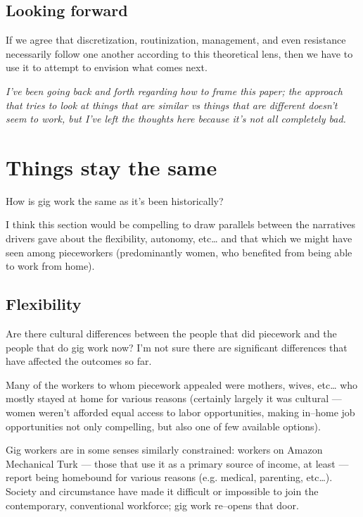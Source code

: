 \documentclass{sigchi}
\begin{document}



\subsection{Looking forward}
If we agree that
discretization,
routinization,
management,
and even resistance
necessarily follow one another according to this theoretical lens,
then we have to use it to attempt to envision
what comes next.



\textit{I've been going back and forth regarding how to frame this paper;
the approach that tries to look at
things that are similar vs things that are different
doesn't seem to work, but
I've left the thoughts here because it's not all completely bad.}

\section{Things stay the same}
How is gig work the same as it's been historically?

I think this section would be compelling to draw parallels between
the narratives drivers gave about the flexibility, autonomy, etc\dots
and that which we might have seen among pieceworkers
(predominantly women, who benefited from being able to work from home).

\subsection{Flexibility}
Are there cultural differences between the people that did piecework and
the people that do gig work now?
I'm not sure there are significant differences that have affected the outcomes so far.

Many of the workers to whom piecework appealed were mothers, wives, etc\dots
who mostly stayed at home for various reasons
(certainly largely it was cultural
--- women weren't afforded equal access to labor opportunities,
making in--home job opportunities not only compelling, but also one of few available options).

Gig workers are in some senses similarly constrained:
workers on Amazon Mechanical Turk
--- those that use it as a primary source of income, at least ---
report being homebound for various reasons (e.g. medical, parenting, etc\dots).
Society and circumstance have made it difficult
or impossible
to join the contemporary, conventional workforce;
gig work re--opens that door.
\end{document}
